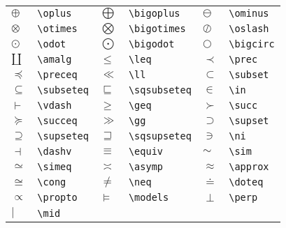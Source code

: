 \documentclass[dvips]{article}
\begin{document}
\begin{longtable}{llllll}
$\oplus$&           \verb|\oplus|&               
$\bigoplus$&        \verb|\bigoplus|&           
$\ominus$&          \verb|\ominus|\\            
$\otimes$&         \verb|\otimes|&          
$\bigotimes$&       \verb|\bigotimes|&           
$\oslash$&          \verb|\oslash|\\       
$\odot$&            \verb|\odot|&               
$\bigodot$&        \verb|\bigodot|&            
$\bigcirc$&         \verb|\bigcirc|\\             
$\amalg$&           \verb|\amalg|&              
$\leq$&             \verb|\leq|&             
$\prec$&           \verb|\prec|\\               
$\preceq$&          \verb|\preceq|&              
$\ll$&              \verb|\ll|&             
$\subset$&          \verb|\subset|\\              
$\subseteq$&       \verb|\subseteq|&           
$\sqsubseteq$&      \verb|\sqsubseteq|&          
$\in$&              \verb|\in|\\       
$\vdash$&          \verb|\vdash|&              
$\geq$&             \verb|\geq|&                 
$\succ$&            \verb|\succ|\\                
$\succeq$&          \verb|\succeq|&              
$\gg$&             \verb|\gg|&           
$\supset$&          \verb|\supset|\\              
$\supseteq$&        \verb|\supseteq|&            
$\sqsupseteq$&     \verb|\sqsupseteq|&         
$\ni$&              \verb|\ni|\\                  
$\dashv$&           \verb|\dashv|&               
$\equiv$&           \verb|\equiv|&               
$\sim$&            \verb|\sim|\\             
$\simeq$&           \verb|\simeq|&               
$\asymp$&           \verb|\asymp|&               
$\approx$&          \verb|\approx|\\              
$\cong$&           \verb|\cong|&               
$\neq$&             \verb|\neq|&              
$\doteq$&           \verb|\doteq|\\               
$\propto$&          \verb|\propto|&              
$\models$&         \verb|\models|&             
$\perp$&            \verb|\perp|\\               
$\mid$&             \verb|\mid|&                 

\end{longtable}
\end{document}
